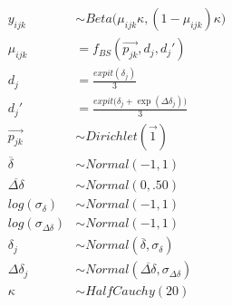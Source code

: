 \begin{align*}
  y_{ijk} &\sim Beta\big(\mu_{ijk} \kappa, (1-\mu_{ijk}) \kappa \big) \\
  \mu_{ijk} &= f_{BS}(\overrightarrow{p_{jk}}, d_j, d_j')  \\
  d_j &= \frac{expit(\delta_j)}{3} \\
  d_j' &= \frac{expit\big(\delta_j + \exp(\Delta\delta_j)\big)}{3} \\
  \overrightarrow{p_{jk}} &\sim Dirichlet(\overrightarrow{1}) \\
  \overline{\delta} &\sim Normal(-1, 1) \\
  \overline{\Delta\delta} &\sim Normal(0, .50) \\
  log(\sigma_{\delta}) &\sim Normal(-1, 1) \\
  log(\sigma_{\Delta\delta}) &\sim Normal(-1, 1) \\
  \delta_j &\sim Normal(\overline{\delta}, \sigma_{\delta}) \\
  \Delta\delta_j &\sim Normal(\overline{\Delta\delta}, \sigma_{\Delta\delta}) \\
  \kappa &\sim HalfCauchy(20) \\
\end{align*}
